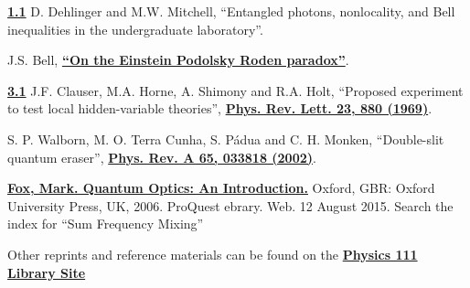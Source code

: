 \documentclass{../lab}
\begin{document}
\begin{thebibliography}{}
\label{sec:References}
    \href{http://physics111.lib.berkeley.edu/Physics111/Reprints/QIE/Entangled\%20Photons-M.W.\%20Mitchell_1.1498860.pdf}{\textbf{1.1}} D. Dehlinger and M.W. Mitchell, ``Entangled photons, nonlocality, and Bell inequalities in the undergraduate laboratory''.

    J.S. Bell, \href{http://physics111.lib.berkeley.edu/Physics111/Reprints/QIE/Bell_Compact.pdf}{\textbf{``On the Einstein Podolsky Roden paradox''}}.

    \href{http://physics111.lib.berkeley.edu/Physics111/Reprints/QIE/Proposed\%20Experiment\%20To\%20Test\%20Local\%20Hidden-variable\%20Theories-PhysRevLett.23.880.pdf}{\textbf{3.1}} J.F. Clauser, M.A. Horne, A. Shimony and R.A. Holt, ``Proposed experiment to test local hidden-variable theories'', \href{http://prl.aps.org/abstract/PRL/v23/i15/p880/_1}{\textbf{Phys. Rev. Lett. 23, 880 (1969)}}.

    S. P. Walborn, M. O. Terra Cunha, S. Pádua and C. H. Monken, ``Double-slit quantum eraser'', \href{http://physics111.lib.berkeley.edu/Physics111/Reprints/QIE/Quantum-Eraser-Walborn.pdf}{\textbf{Phys. Rev. A 65, 033818 (2002)}}.

    \href{http://physics111.lib.berkeley.edu/Physics111/Reprints/QIE/Mark\%20Fox_Quantum\%20Optics\%20An\%20Introduction.pdf}{\textbf{Fox, Mark. Quantum Optics: An Introduction.}} Oxford, GBR: Oxford University Press, UK, 2006. ProQuest ebrary. Web. 12 August 2015. Search the index for ``Sum Frequency Mixing''

\end{thebibliography}

\vspace{1em}

\noindent Other reprints and reference materials can be found on the \href{\LabReprints}{\textbf{Physics 111 Library Site}}
\end{document}
